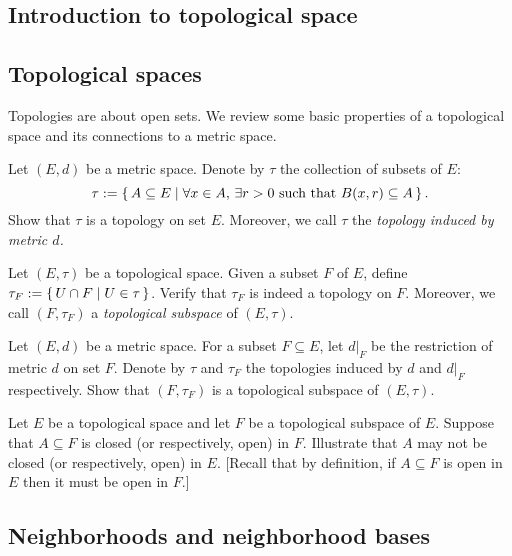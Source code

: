 \begin{center}
  \section{Introduction to topological space}
\end{center}

\setcounter{section}{1}
\subsection{Topological spaces}

Topologies are about open sets.
We review some basic properties of a topological space and its connections to a metric space.

\begin{qst}
  Let $(E,d)$ be a metric space. Denote by $\tau$ the collection of subsets of $E$:
  $$
  \tau := \set{A \subseteq E | \forall x\in A, \, \exists r >0 \text{ such that } B(x,r) \subseteq A}. 
  $$
Show that $\tau$ is a topology on set $E$. 
Moreover, we call $\tau$ the {\em topology induced by metric $d$.}  
\end{qst}

\begin{qst}
  Let $(E, \tau)$ be a topological space. 
  Given a subset $F$ of $E$, define $\tau_F := \set{U \cap F | U \in \tau}$. Verify that $\tau_F$ is indeed a topology on $F$.
  Moreover, we call $(F, \tau_F)$ a {\em topological subspace} of $(E, \tau)$. 
\end{qst}

\begin{qst}
  Let $(E,d)$ be a metric space. For a subset $F \subseteq E$, let $d|_F$  be the restriction of metric $d$ on set $F$.
  Denote by $\tau$ and $\tau_F$ the topologies induced by $d$ and $d|_F$ respectively.
  Show that $(F, \tau_F)$ is a topological subspace of $(E, \tau)$.
\end{qst}

\begin{qst}
  Let $E$ be a topological space and let $F$ be a topological subspace of $E$. Suppose that $A \subseteq F$ is closed (or respectively, open) in $F$.
  Illustrate that $A$ may not be closed (or respectively, open) in $E$. [Recall that by definition, if $A \subseteq F$ is open in $E$ then it must be open in $F$.]
\end{qst}


\subsection{Neighborhoods and neighborhood bases}

